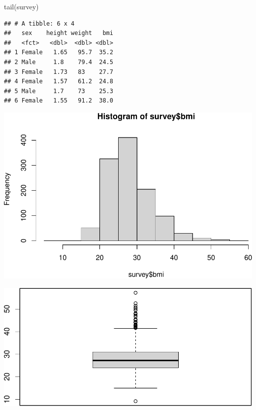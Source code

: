 \documentclass[
]{memoir}
\newenvironment{Shaded}{\begin{snugshade}}{\end{snugshade}}
\newcommand{\FunctionTok}[1]{\textcolor[rgb]{0.00,0.00,0.00}{#1}}
\newcommand{\NormalTok}[1]{#1}
\newcommand{\SpecialCharTok}[1]{\textcolor[rgb]{0.00,0.00,0.00}{#1}}
\begin{document}
\begin{Shaded}
\begin{Highlighting}[]
\FunctionTok{tail}\NormalTok{(survey)}
\end{Highlighting}
\end{Shaded}

\begin{verbatim}
## # A tibble: 6 x 4
##   sex    height weight   bmi
##   <fct>   <dbl>  <dbl> <dbl>
## 1 Female   1.65   95.7  35.2
## 2 Male     1.8    79.4  24.5
## 3 Female   1.73   83    27.7
## 4 Female   1.57   61.2  24.8
## 5 Male     1.7    73    25.3
## 6 Female   1.55   91.2  38.0
\end{verbatim}

\begin{Shaded}
\end{Shaded}

\includegraphics{phcm9795-R-notes_files/figure-latex/unnamed-chunk-64-1.pdf}

\begin{Shaded}
\end{Shaded}

\includegraphics{phcm9795-R-notes_files/figure-latex/unnamed-chunk-64-2.pdf}
\end{document}
